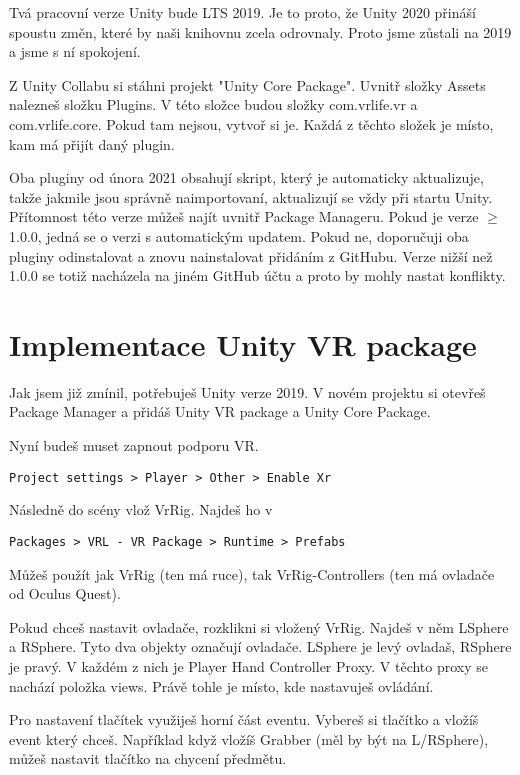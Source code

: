 \documentclass{article}
\begin{document}
Tvá pracovní verze Unity bude LTS 2019. Je to proto, že Unity 2020 přináší spoustu změn, které by naši knihovnu zcela odrovnaly. Proto jsme zůstali na 2019 a jsme s ní spokojení.

Z Unity Collabu si stáhni projekt "Unity Core Package". Uvnitř složky Assets nalezneš složku Plugins. V této složce budou složky com.vrlife.vr a com.vrlife.core. Pokud tam nejsou, vytvoř si je. Každá z těchto složek je místo, kam má přijít daný plugin.

Oba pluginy od února 2021 obsahují skript, který je automaticky aktualizuje, takže jakmile jsou správně naimportovaní, aktualizují se vždy při startu Unity. Přítomnost této verze můžeš najít uvnitř Package Manageru. Pokud je verze $\geq$ 1.0.0, jedná se o verzi s automatickým updatem. Pokud ne, doporučuji oba pluginy odinstalovat a znovu nainstalovat přidáním z GitHubu. Verze nižší než 1.0.0 se totiž nacházela na jiném GitHub účtu a proto by mohly nastat konflikty.
\pagebreak

\section{Implementace Unity VR package}
Jak jsem již zmínil, potřebuješ Unity verze 2019. V novém projektu si otevřeš Package Manager a přidáš Unity VR package a Unity Core Package.

Nyní budeš muset zapnout podporu VR.

\begin{lstlisting}
Project settings > Player > Other > Enable Xr
\end{lstlisting}

Následně do scény vlož VrRig. Najdeš ho v 
\begin{lstlisting}
Packages > VRL - VR Package > Runtime > Prefabs
\end{lstlisting}
Můžeš použít jak VrRig (ten má ruce), tak VrRig-Controllers (ten má ovladače od Oculus Quest).

Pokud chceš nastavit ovladače, rozklikni si vložený VrRig. Najdeš v něm LSphere a RSphere. Tyto dva objekty označují ovladače. LSphere je levý ovladaš, RSphere je pravý. V každém z nich je Player Hand Controller Proxy. V těchto proxy se nachází položka views. Právě tohle je místo, kde nastavuješ ovládání.

Pro nastavení tlačítek využiješ horní část eventu. Vybereš si tlačítko a vložíš event který chceš. Například když vložíš Grabber (měl by být na L/RSphere), můžeš nastavit tlačítko na chycení předmětu.
\end{document}

